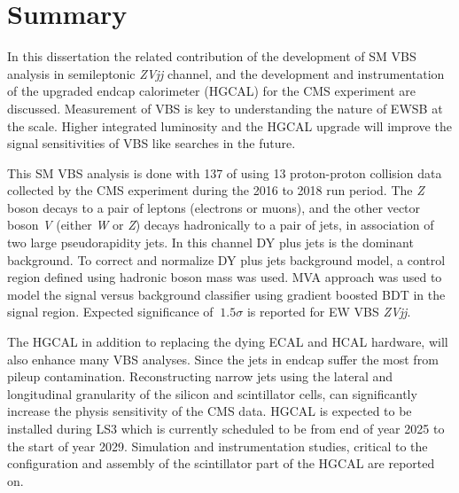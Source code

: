 \chapter{
  Summary
 }\label{ch_results}

In this dissertation the related contribution of the
development of \gls{SM} \gls{VBS}
analysis in semileptonic \textit{ZVjj} channel, and
the development and instrumentation of the upgraded endcap calorimeter
(\gls{HGCAL}) for the \gls{CMS} experiment are discussed.
Measurement of \gls{VBS} is key to understanding the nature of \gls{EWSB} at the \TeV{} scale.
Higher integrated luminosity and the \gls{HGCAL} upgrade will improve the signal sensitivities of VBS like searches
in the future.

This \gls{SM} \gls{VBS} analysis is done with 137 \fbinv{} of
using 13\TeV{} proton-proton collision
data collected by the \gls{CMS} experiment during the 2016 to 2018 run period.
The \textit{Z} boson decays to a pair of leptons (electrons or muons),
and the other vector boson \textit{V} (either \textit{W} or \textit{Z})
decays hadronically to a pair of jets, in association of two large pseudorapidity jets.
In this channel DY plus jets is the dominant background.
To correct
and normalize DY plus jets background model, a control region
defined using hadronic boson mass was used.
\gls{MVA} approach was used to
model the signal versus background classifier using gradient boosted
\gls{BDT} in the signal region.
Expected significance of \( ~1.5\sigma \) is reported for
\gls{EW} \gls{VBS} \textit{ZVjj}.

The \gls{HGCAL} in addition to replacing the dying \gls{ECAL} and \gls{HCAL}
hardware, will also enhance many \gls{VBS} analyses.
Since the jets in endcap suffer the most from pileup
contamination. Reconstructing narrow jets
using the lateral and longitudinal granularity of the silicon and scintillator cells,
can significantly increase the physis sensitivity of the \gls{CMS} data.
\gls{HGCAL} is expected to be installed
during \gls{LS3} which is currently scheduled to be from end of year 2025
to the start of year 2029. Simulation and instrumentation studies,
critical to the configuration and assembly of the scintillator part of
the \gls{HGCAL} are reported on.